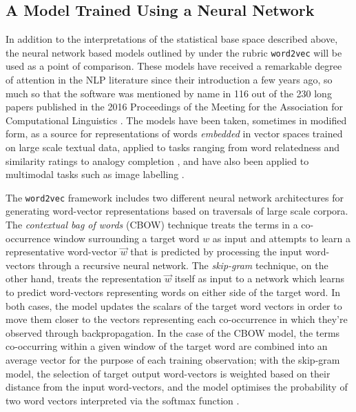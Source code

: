 \subsection{A Model Trained Using a Neural Network} \label{sec:w2v}
In addition to the interpretations of the statistical base space described above, the neural network based models outlined by \cite{MikolovEA2013b} under the rubric \texttt{word2vec} will be used as a point of comparison.  These models have received a remarkable degree of attention in the NLP literature since their introduction a few years ago, so much so that the software was mentioned by name in 116 out of the 230 long papers published in the 2016 Proceedings of the Meeting for the Association for Computational Linguistics \citep{ErkEA2016}.  The models have been taken, sometimes in modified form, as a source for representations of words \emph{embedded} in vector spaces trained on large scale textual data, applied to tasks ranging from word relatedness and similarity ratings \citep{KielaEA2015} to analogy completion \citep{MikolovEA2013}, and have also been applied to multimodal tasks such as image labelling \citep{KotturEA2016}.

The \texttt{word2vec} framework includes two different neural network architectures for generating word-vector representations based on traversals of large scale corpora.  The \emph{contextual bag of words} (CBOW) technique treats the terms in a co-occurrence window surrounding a target word $w$ as input and attempts to learn a representative word-vector $\overrightarrow{w}$ that is predicted by processing the input word-vectors through a recursive neural network.  The \emph{skip-gram} technique, on the other hand, treats the representation $\overrightarrow{w}$ itself as input to a network which learns to predict word-vectors representing words on either side of the target word.  In both cases, the model updates the scalars of the target word vectors in order to move them closer to the vectors representing each co-occurrence in which they're observed through backpropagation.  In the case of the CBOW model, the terms co-occurring within a given window of the target word are combined into an average vector for the purpose of each training observation; with the skip-gram model, the selection of target output word-vectors is weighted based on their distance from the input word-vectors, and the model optimises the probability of two word vectors interpreted via the softmax function \citep[see][for more details]{MikolovEA2013c}.

